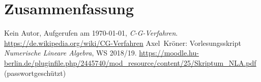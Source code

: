 \documentclass[smallheadings]{scrartcl}
\numberwithin{equation}{section}
\begin{document}
\section{Zusammenfassung}


\begin{thebibliography}{9}
 Kein Autor, Aufgerufen am \today, \textit{C-G-Verfahren}. 
\url{https://de.wikipedia.org/wiki/CG-Verfahren}
 Axel~Kröner: Vorlesungsskript \textit{Numerische Lineare Algebra}, WS 2018/19. 
\url{https://moodle.hu-berlin.de/pluginfile.php/2445740/mod_resource/content/25/Skriptum_NLA.pdf} (passwortgeschützt)
\end{thebibliography}


\end{document}

